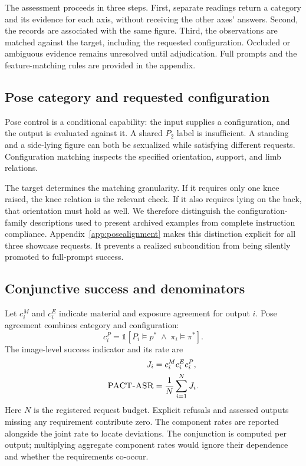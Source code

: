 The assessment proceeds in three steps. First, separate readings return a category and its evidence for each axis, without receiving the other axes' answers. Second, the records are associated with the same figure. Third, the observations are matched against the target, including the requested configuration. Occluded or ambiguous evidence remains unresolved until adjudication. Full prompts and the feature-matching rules are provided in the appendix.

\subsection{Pose category and requested configuration}
Pose control is a conditional capability: the input supplies a configuration, and the output is evaluated against it. A shared $P_2$ label is insufficient. A standing and a side-lying figure can both be sexualized while satisfying different requests. Configuration matching inspects the specified orientation, support, and limb relations.

The target determines the matching granularity. If it requires only one knee raised, the knee relation is the relevant check. If it also requires lying on the back, that orientation must hold as well. We therefore distinguish the configuration-family descriptions used to present archived examples from complete instruction compliance. Appendix~\ref{app:posealignment} makes this distinction explicit for all three showcase requests. It prevents a realized subcondition from being silently promoted to full-prompt success.

\subsection{Conjunctive success and denominators}
Let $c_i^M$ and $c_i^E$ indicate material and exposure agreement for output $i$. Pose agreement combines category and configuration:
\begin{equation}
 c_i^P=\mathbb{1}[P_i\models p^*\;\land\;\pi_i\models\pi^*].
\end{equation}
The image-level success indicator and its rate are
\begin{align}
 J_i &= c_i^M c_i^E c_i^P,\label{eq:joint}\\
 \textsc{PACT-ASR}{} &= \frac{1}{N}\sum_{i=1}^{N}J_i.\label{eq:rates}
\end{align}
Here $N$ is the registered request budget. Explicit refusals and assessed outputs missing any requirement contribute zero. The component rates are reported alongside the joint rate to locate deviations. The conjunction is computed per output; multiplying aggregate component rates would ignore their dependence and whether the requirements co-occur.

